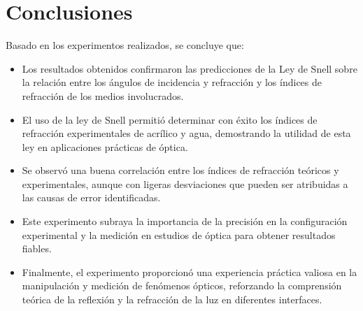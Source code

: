 \section{Conclusiones}
Basado en los experimentos realizados, se concluye que:
\begin{itemize}
    \item Los resultados obtenidos confirmaron las predicciones de la Ley de Snell sobre la relación entre los ángulos de incidencia y refracción y los índices de refracción de los medios involucrados.
    \item El uso de la ley de Snell permitió determinar con éxito los índices de refracción experimentales de acrílico y agua, demostrando la utilidad de esta ley en aplicaciones prácticas de óptica.
    \item Se observó una buena correlación entre los índices de refracción teóricos y experimentales, aunque con ligeras desviaciones que pueden ser atribuidas a las causas de error identificadas.
    \item Este experimento subraya la importancia de la precisión en la configuración experimental y la medición en estudios de óptica para obtener resultados fiables.
    \item Finalmente, el experimento proporcionó una experiencia práctica valiosa en la manipulación y medición de fenómenos ópticos, reforzando la comprensión teórica de la reflexión y la refracción de la luz en diferentes interfaces.
\end{itemize}
